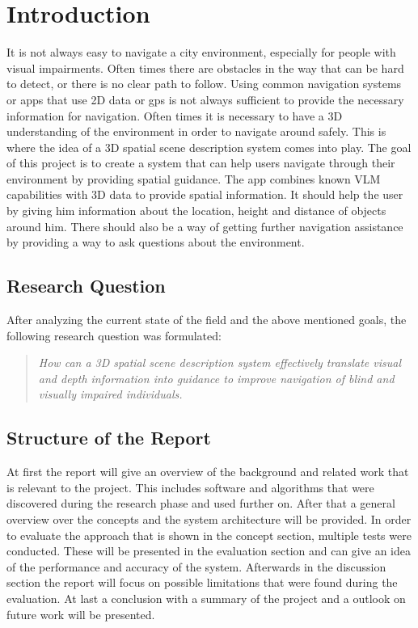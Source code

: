 \section{Introduction}
It is not always easy to navigate a city environment, especially for people with visual impairments.
Often times there are obstacles in the way that can be hard to detect, or there is no clear path to follow.
Using common navigation systems or apps that use 2D data or gps is not always sufficient to provide the necessary information for navigation.
Often times it is necessary to have a 3D understanding of the environment in order to navigate around safely.
This is where the idea of a 3D spatial scene description system comes into play.
The goal of this project is to create a system that can help users navigate through their environment by providing spatial guidance.
The app combines known VLM capabilities with 3D data to provide spatial information.
It should help the user by giving him information about the location, height and distance of objects around him.
There should also be a way of getting further navigation assistance by providing a way to ask questions about the environment.

\subsection{Research Question}
After analyzing the current state of the field and the above mentioned goals, the following research question was formulated:
\begin{quote}
\textit{How can a 3D spatial scene description 
system effectively translate visual and 
depth information into guidance to 
improve navigation of blind and visually 
impaired individuals.}
\end{quote}

\subsection{Structure of the Report}
At first the report will give an overview of the background and related work that is relevant to the project.
This includes software and algorithms that were discovered during the research phase and used further on.
After that a general overview over the concepts and the system architecture will be provided.
In order to evaluate the approach that is shown in the concept section, multiple tests were conducted.
These will be presented in the evaluation section and can give an idea of the performance and accuracy of the system.
Afterwards in the discussion section the report will focus on possible limitations that were found during the evaluation.
At last a conclusion with a summary of the project and a outlook on future work will be presented.
